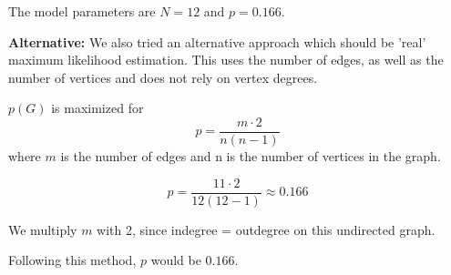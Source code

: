 \begin{enumerate}
	The model parameters are $N = 12$ and $p = 0.166$.
		
	\textbf{Alternative:} We also tried an alternative approach which should be 'real' maximum likelihood estimation.  This uses the number of edges,  as well as the number of vertices and does not rely on vertex degrees.
	
	$p(G)$ is maximized for 
	\begin{equation*}
		p = \frac{m \cdot 2}{n(n-1)}
	\end{equation*}
	where $m$ is the number of edges and n is the number of vertices in the graph.
	
	\begin{equation*}
		p = \frac{11 \cdot 2}{12(12-1)} \approx 0.166
	\end{equation*}
	
	We multiply $m$ with 2,  since indegree = outdegree on this undirected graph.
	
	Following this method,  $p$ would be $0.166$.
	
\end{enumerate}